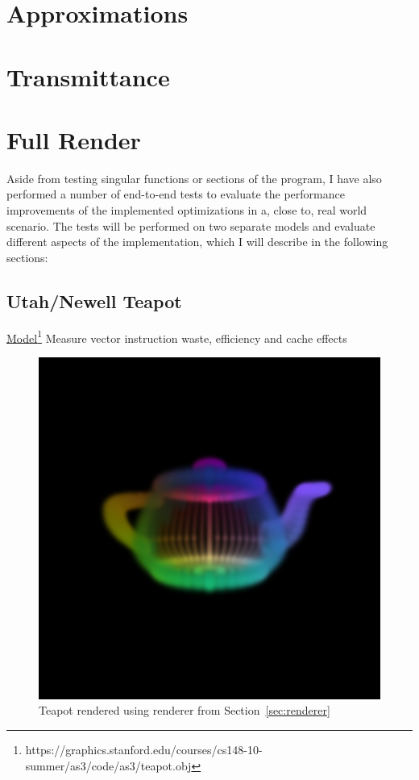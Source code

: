 \documentclass[a4paper, 11pt]{memoir}
\begin{document}
    \section{Approximations}
    \section{Transmittance}
    \section{Full Render}
    Aside from testing singular functions or sections of the program, I have also performed a number of end-to-end tests
    to evaluate the performance improvements of the implemented optimizations in a, close to, real world scenario.
    The tests will be performed on two separate models and evaluate different aspects of the implementation,
    which I will describe in the following sections:
    \subsection{Utah/Newell Teapot}
    \href{https://graphics.stanford.edu/courses/cs148-10-summer/as3/code/as3/teapot.obj}{Model}\footnote{https://graphics.stanford.edu/courses/cs148-10-summer/as3/code/as3/teapot.obj}
    Measure vector instruction waste, efficiency and cache effects

    \begin{figure}[t]
        \centering
        \includegraphics[scale=.2]{images/teapot.png}
        \caption{Teapot rendered using renderer from Section~\ref{sec:renderer}}
        \label{fig:teapot_render}
    \end{figure}
\end{document}

